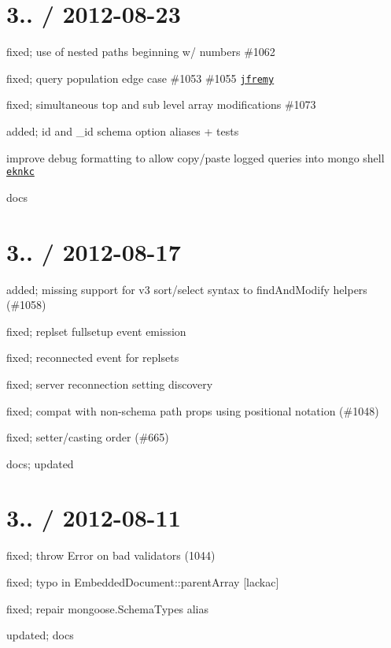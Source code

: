 \section*{3.. / 2012-\/08-\/23 }


\begin{DoxyItemize}
\item fixed; use of nested paths beginning w/ numbers \#1062
\item fixed; query population edge case \#1053 \#1055 \href{https://github.com/jfremy}{\tt jfremy}
\item fixed; simultaneous top and sub level array modifications \#1073
\item added; id and \+\_\+id schema option aliases + tests
\item improve debug formatting to allow copy/paste logged queries into mongo shell \href{https://github.com/eknkc}{\tt eknkc}
\item docs
\end{DoxyItemize}

\section*{3.. / 2012-\/08-\/17 }


\begin{DoxyItemize}
\item added; missing support for v3 sort/select syntax to find\+And\+Modify helpers (\#1058)
\item fixed; replset fullsetup event emission
\item fixed; reconnected event for replsets
\item fixed; server reconnection setting discovery
\item fixed; compat with non-\/schema path props using positional notation (\#1048)
\item fixed; setter/casting order (\#665)
\item docs; updated
\end{DoxyItemize}

\section*{3.. / 2012-\/08-\/11 }


\begin{DoxyItemize}
\item fixed; throw Error on bad validators (1044)
\item fixed; typo in Embedded\+Document\+::parent\+Array \mbox{[}lackac\mbox{]}
\item fixed; repair mongoose.\+Schema\+Types alias
\item updated; docs
\end{DoxyItemize}

